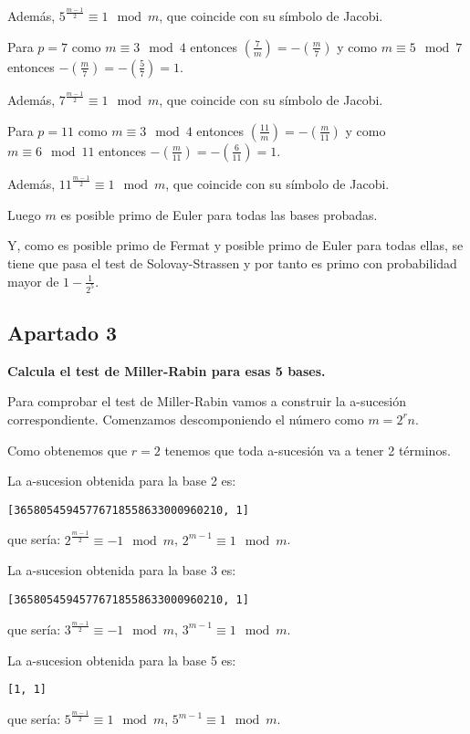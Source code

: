 \documentclass[a4paper]{article}
\begin{document}
Además, $5^{\frac{m-1}{2}}\equiv 1\mod m$, que coincide con su símbolo de Jacobi.

Para $p=7$ como $m\equiv 3\mod 4$ entonces $\left( \frac{7}{m}\right)=-\left( \frac{m}{7}\right)$ y como $m\equiv 5\mod 7$ entonces $-\left( \frac{m}{7}\right)=-\left( \frac{5}{7}\right)=1$.

Además, $7^{\frac{m-1}{2}}\equiv 1\mod m$, que coincide con su símbolo de Jacobi.

Para $p=11$ como $m\equiv 3\mod 4$ entonces $\left( \frac{11}{m}\right)=-\left( \frac{m}{11}\right)$ y como $m\equiv 6\mod 11$ entonces $-\left( \frac{m}{11}\right)=-\left( \frac{6}{11}\right)=1$.

Además, $11^{\frac{m-1}{2}}\equiv 1\mod m$, que coincide con su símbolo de Jacobi.

Luego $m$ es posible primo de Euler para todas las bases probadas.

Y, como es posible primo de Fermat y posible primo de Euler para todas ellas, se tiene que pasa el test de Solovay-Strassen y por tanto es primo con probabilidad mayor de $1-\frac{1}{2^5}$.

\subsection{Apartado 3}

\textbf{Calcula el test de Miller-Rabin para esas 5 bases.}

Para comprobar el test de Miller-Rabin vamos a construir la a-sucesión correspondiente. Comenzamos descomponiendo el número como $m=2^rn$.

Como obtenemos que $r=2$ tenemos que toda a-sucesión va a tener 2 términos.

La a-sucesion obtenida para la base 2 es:
\begin{verbatim}
[36580545945776718558633000960210, 1]
\end{verbatim}
que sería: $2^{\frac{m-1}{2}}\equiv -1\mod m$, $2^{m-1}\equiv 1\mod m$.

La a-sucesion obtenida para la base 3 es:
\begin{verbatim}
[36580545945776718558633000960210, 1]
\end{verbatim}
que sería: $3^{\frac{m-1}{2}}\equiv -1\mod m$, $3^{m-1}\equiv 1\mod m$.

La a-sucesion obtenida para la base 5 es:
\begin{verbatim}
[1, 1]
\end{verbatim}
que sería: $5^{\frac{m-1}{2}}\equiv 1\mod m$, $5^{m-1}\equiv 1\mod m$.
\end{document}

